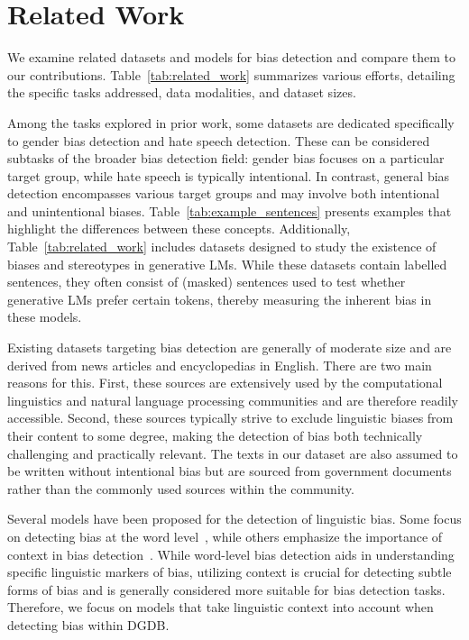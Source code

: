 \section{Related Work}
\label{sec:related_work}

We examine related datasets and models for bias detection and compare them to our contributions. Table~\ref{tab:related_work} summarizes various efforts, detailing the specific tasks addressed, data modalities, and dataset sizes.

Among the tasks explored in prior work, some datasets are dedicated specifically to gender bias detection and hate speech detection. These can be considered subtasks of the broader bias detection field: gender bias focuses on a particular target group, while hate speech is typically intentional. In contrast, general bias detection encompasses various target groups and may involve both intentional and unintentional biases. Table~\ref{tab:example_sentences} presents examples that highlight the differences between these concepts. Additionally, Table~\ref{tab:related_work} includes datasets designed to study the existence of biases and stereotypes in generative LMs. 
While these datasets contain labelled sentences, they often consist of (masked) sentences used to test whether generative LMs prefer certain tokens, thereby measuring the inherent bias in these models.

Existing datasets targeting bias detection are generally of moderate size and are derived from news articles and encyclopedias in English. There are two main reasons for this. First, these sources are extensively used by the computational linguistics and natural language processing communities and are therefore readily accessible. Second, these sources typically strive to exclude linguistic biases from their content to some degree, making the detection of bias both technically challenging and practically relevant. The texts in our dataset are also assumed to be written without intentional bias but are sourced from government documents rather than the commonly used sources within the community.

Several models have been proposed for the detection of linguistic bias. Some focus on detecting bias at the word level~\cite{recasens-etal-2013-linguistic,hube2018detecting,spinde2021automated}, while others emphasize the importance of context in bias detection~\cite{kuang2016semantic,recasens-etal-2013-linguistic,bartl-etal-2020-unmasking,zhang-etal-2020-demographics}. While word-level bias detection aids in understanding specific linguistic markers of bias, utilizing context is crucial for detecting subtle forms of bias and is generally considered more suitable for bias detection tasks. Therefore, we focus on models that take linguistic context into account when detecting bias within DGDB.